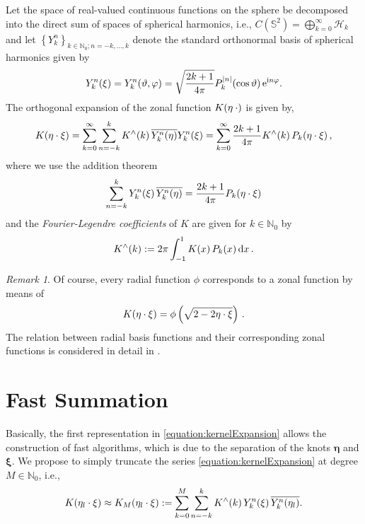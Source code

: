 \documentclass[11pt,a4paper,twoside,bibtotoc]{scrartcl}
\theoremstyle{plain}
\theoremstyle{definition}
\theoremstyle{remark}
\newtheorem{remark}[theorem]{Remark}
\newcommand{\NZ}{\ensuremath{\mathbb{N}_{0}}}
\newcommand{\set}[1]{\ensuremath{\left\{#1\right\rbrace}}
\newcommand{\twosphere}{\ensuremath{\mathbb{S}^2}}
\newcommand{\fun}[2]{\ensuremath{#1{\hspace{-0.4ex}}\left(#2\right)}}
\newcommand{\mb}[1]{\mathbf{#1}}
\newcommand{\V}[1]{\mb{#1}}
\newcommand{\dx}{\text{\rm{d}}}
\newcommand{\e}{\mbox{\rm{e}}}
\newcommand{\im}{\mbox{\scriptsize\rm{i}}}
\numberwithin{equation}{section}
\numberwithin{table}{section}
\numberwithin{figure}{section}
\begin{document}
Let the space of real-valued continuous functions on the sphere be decomposed
into the direct sum of spaces of spherical harmonics, i.e.,
$C(\twosphere)=\bigoplus_{k=0}^{\infty} \mathcal{H}_k$ and let
$\set{Y_{k}^n}_{k \in \NZ; n=-k,\ldots,k}$ denote the 
standard orthonormal basis of spherical harmonics given by
\[
  \fun{Y_{k}^n}{\V{\xi}} = \fun{Y_{k}^n}{\vartheta,\varphi} = 
  \sqrt{\frac{2k+1}{4\pi}} 
  \fun{P_{k}^{|n|}}{\cos\vartheta} \e^{\im n \varphi}.
\]
The orthogonal expansion of the zonal function $\fun{K}{\V{\eta} \: \cdot}$
is given by,
\begin{equation}
  \label{equation:kernelExpansion}
  \fun{K}{\V{\eta} \cdot \V{\xi}} = \sum_{k = 0}^{\infty} \sum_{n=-k}^k
  \fun{K^{\wedge}}{k}\overline{\fun{Y_{k}^n}{\V{\eta}}} \fun{Y_{k}^n}{\V{\xi}}
  = \sum_{k = 0}^{\infty} \frac{2k+1}{4\pi} \fun{K^{\wedge}}{k}
  \fun{P_{k}}{\V{\eta} \cdot \V{\xi}},
\end{equation}
where we use the addition theorem
\[
\sum_{n=-k}^{k} \fun{Y_{k}^n}{\V{\xi}} \overline{\fun{Y_{k}^n}{\V{\eta}}} =
    \frac{2k+1}{4\pi}\fun{P_k}{\V{\eta} \cdot \V{\xi}}
\]
and the \emph{Fourier-Legendre coefficients} of $K$ are given for $k \in \NZ$
by
\begin{equation}
  \label{equation:legtrafo}
  \fun{K^{\wedge}}{k} := 2 \pi \int_{-1}^{1} \fun{K}{x} \fun{P_{k}}{x} \dx 
  x\,.
\end{equation}

\begin{remark}
Of course, every radial function $\phi$ corresponds to a zonal function by
means of 
\[
  \fun{K}{\V{\eta} \cdot \V{\xi}} = \phi\left(\sqrt{2-2\V{\eta} \cdot
  \V{\xi}}\right)\,.
\]
The relation between radial basis functions and their corresponding zonal
functions is considered in detail in \cite{CaFi}.
\end{remark}

\section{Fast Summation}
Basically, the first representation in \eqref{equation:kernelExpansion} allows
the construction of fast algorithms, which is due to the separation of the
knots $\V{\eta}$ and $\V{\xi}$.
We propose to simply truncate the series \eqref{equation:kernelExpansion} at
degree $M \in \NZ$, i.e.,
\begin{equation}
  \label{Applications:TruncatedSeries}
  \fun{K}{\V{\eta}_{l} \cdot \V{\xi}} \approx \fun{K_{M}}{\V{\eta}_{l} \cdot
  \V{\xi}} := \sum_{k=0}^{M} \sum_{n=-k}^k \fun{K^{\wedge}}{k}
  \fun{Y_{k}^n}{\V{\xi}} \overline{\fun{Y_{k}^n}{\V{\eta}_{l}}}.
\end{equation}
\end{document}
